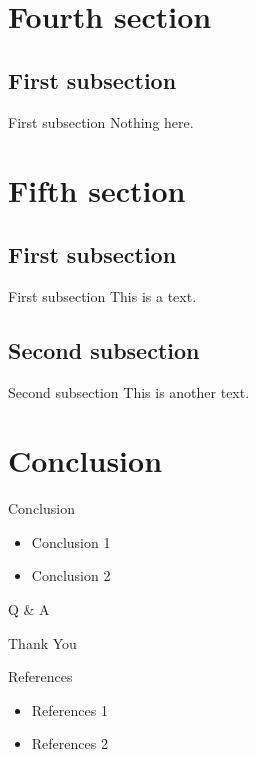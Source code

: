 \documentclass{beamer}
\begin{document}
\section{Fourth section}
\subsection{First subsection}
\begin{frame}{First subsection}
    Nothing here.
\end{frame}


\section{Fifth section}
\subsection{First subsection}
\begin{frame}{First subsection}
    This is a text.
\end{frame}


\subsection{Second subsection}
\begin{frame}{Second subsection}
    This is another text.
\end{frame}


\section{Conclusion}
\begin{frame}{Conclusion}
    \begin{itemize}
        \item Conclusion 1
        \item Conclusion 2
    \end{itemize}
\end{frame}


\begin{frame}[plain]
    \begin{center}
        \Huge \textcolor{ocean}{Q \& A}
    \end{center}
\end{frame}


\begin{frame}[plain]
    \begin{center}
        \Huge \textcolor{ocean}{Thank You}
    \end{center}
\end{frame}
 

\begin{frame}{References}
    \begin{itemize}
        \item References 1
        \item References 2
    \end{itemize}
\end{frame}
\end{document}
